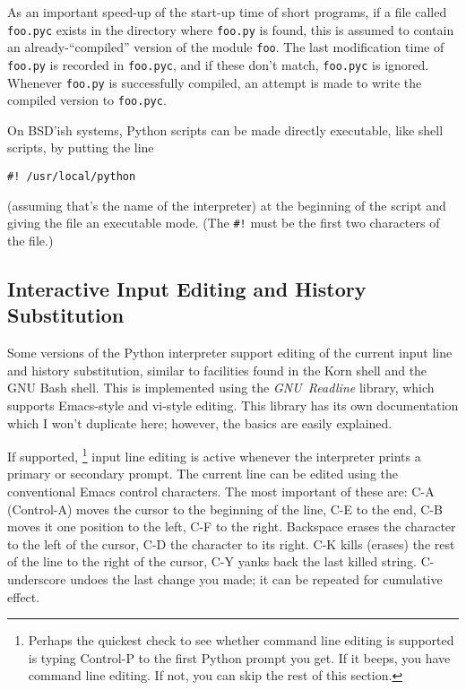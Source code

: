 As an important speed-up of the start-up time of short programs, if a
file called {\tt foo.pyc} exists in the directory where {\tt foo.py}
is found, this is assumed to contain an already-``compiled'' version
of the module {\tt foo}.  The last modification time of {\tt foo.py}
is recorded in {\tt foo.pyc}, and if these don't match, {\tt foo.pyc}
is ignored.  Whenever {\tt foo.py} is successfully compiled, an
attempt is made to write the compiled version to {\tt foo.pyc}.

On BSD'ish {\UNIX} systems, Python scripts can be made directly executable,
like shell scripts, by putting the line
\bcode\begin{verbatim}
#! /usr/local/python
\end{verbatim}\ecode
(assuming that's the name of the interpreter) at the beginning of the
script and giving the file an executable mode.
(The
{\tt \#!}
must be the first two characters of the file.)

\subsection{Interactive Input Editing and History Substitution}

Some versions of the Python interpreter support editing of the current
input line and history substitution, similar to facilities found in the
Korn shell and the GNU Bash shell.
This is implemented using the
{\em GNU\ Readline}
library, which supports Emacs-style and vi-style editing.
This library has its own documentation which I won't duplicate here;
however, the basics are easily explained.

If supported,%
\footnote{
	Perhaps the quickest check to see whether command line editing
	is supported is typing Control-P to the first Python prompt
	you get.  If it beeps, you have command line editing.
	If not, you can skip the rest of this section.
}
input line editing is active whenever the interpreter prints a primary
or secondary prompt.
The current line can be edited using the conventional Emacs control
characters.
The most important of these are:
C-A (Control-A) moves the cursor to the beginning of the line, C-E to
the end, C-B moves it one position to the left, C-F to the right.
Backspace erases the character to the left of the cursor, C-D the
character to its right.
C-K kills (erases) the rest of the line to the right of the cursor, C-Y
yanks back the last killed string.
C-underscore undoes the last change you made; it can be repeated for
cumulative effect.

